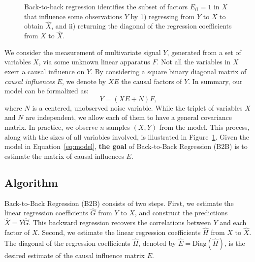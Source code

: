 \documentclass{article}
\begin{document}
\begin{figure}[t!]
    \caption{Back-to-back regression identifies the subset of factors $E_{ii} = 1$ in $X$ that influence some observations $Y$ by 1) regressing from $Y$ to $X$ to obtain $\hat{X}$, and ii) returning the diagonal of the regression coefficients from $X$ to $\hat{X}$.}
    \label{fig:b2b}
\end{figure}

We consider the measurement of multivariate signal $Y$, generated from a set of variables $X$, via some unknown linear apparatus $F$.
%
Not all the variables in $X$ exert a causal influence on $Y$.
%
By considering a square binary diagonal matrix of \emph{causal influences} $E$, we denote by $XE$ the causal factors of $Y$.
%
In summary, our model can be formalized as:
%
\begin{equation}
    Y = (XE + N)F,\label{eq:model}
\end{equation}
%
where $N$ is a centered, unobserved noise variable.
%
While the triplet of variables $X$ and $N$ are independent, we allow each of them to have a general covariance matrix.
%
In practice, we observe $n$ samples $(X, Y)$ from the model.
%
This process, along with the sizes of all variables involved, is illustrated in Figure~\ref{fig:b2b}.
%
Given the model in Equation~\eqref{eq:model}, \textbf{the goal} of Back-to-Back Regression (B2B) is to estimate the matrix of causal influences $E$.

\subsection{Algorithm}


Back-to-Back Regression (B2B) consists of two steps.
%
First, we estimate the linear regression coefficients $\hat G$ from $Y$ to $X$, and construct the predictions $\hat X = Y \hat G$.
%
This backward regression recovers the correlations between $Y$ and each factor of $X$.
%
Second, we estimate the linear regression coefficients $\hat H$ from $X$ to $\hat X$.
%
The diagonal of the regression coefficients $\hat H$, denoted by $\hat{E} = \text{Diag}(\hat{H})$, is the desired estimate of the causal influence matrix $E$.
\end{document}
